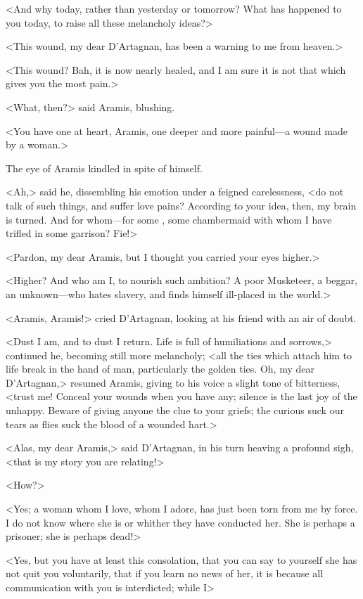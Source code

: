 <And why today, rather than yesterday or tomorrow? What has happened to you today, to raise all these melancholy ideas?> 

<This wound, my dear D'Artagnan, has been a warning to me from heaven.> 

<This wound? Bah, it is now nearly healed, and I am sure it is not that which gives you the most pain.> 

<What, then?> said Aramis, blushing. 

<You have one at heart, Aramis, one deeper and more painful—a wound made by a woman.> 

The eye of Aramis kindled in spite of himself. 

<Ah,> said he, dissembling his emotion under a feigned carelessness, <do not talk of such things, and suffer love pains?  According to your idea, then, my brain is turned. And for whom—for some , some chambermaid with whom I have trifled in some garrison? Fie!> 

<Pardon, my dear Aramis, but I thought you carried your eyes higher.> 

<Higher? And who am I, to nourish such ambition? A poor Musketeer, a beggar, an unknown—who hates slavery, and finds himself ill-placed in the world.> 

<Aramis, Aramis!> cried D'Artagnan, looking at his friend with an air of doubt. 

<Dust I am, and to dust I return. Life is full of humiliations and sorrows,> continued he, becoming still more melancholy; <all the ties which attach him to life break in the hand of man, particularly the golden ties. Oh, my dear D'Artagnan,> resumed Aramis, giving to his voice a slight tone of bitterness, <trust me! Conceal your wounds when you have any; silence is the last joy of the unhappy. Beware of giving anyone the clue to your griefs; the curious suck our tears as flies suck the blood of a wounded hart.> 

<Alas, my dear Aramis,> said D'Artagnan, in his turn heaving a profound sigh, <that is my story you are relating!> 

<How?> 

<Yes; a woman whom I love, whom I adore, has just been torn from me by force. I do not know where she is or whither they have conducted her. She is perhaps a prisoner; she is perhaps dead!> 

<Yes, but you have at least this consolation, that you can say to yourself she has not quit you voluntarily, that if you learn no news of her, it is because all communication with you is interdicted; while I\longdash> 

